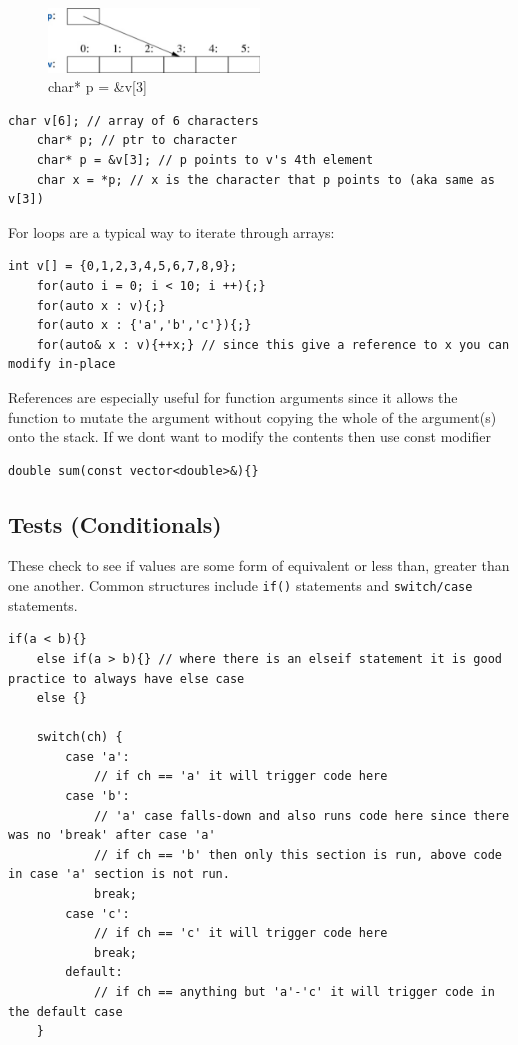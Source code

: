\documentclass[a4paper, 10pt]{article}
\begin{document}
\begin{figure}[ht]
	\centering
	\includegraphics[width=0.5\textwidth]{pointer.png}
	\caption{char* p = \&v[3]}
\end{figure}

\begin{lstlisting}[style=cpp]
    char v[6]; // array of 6 characters
    char* p; // ptr to character
    char* p = &v[3]; // p points to v's 4th element
    char x = *p; // x is the character that p points to (aka same as v[3])
\end{lstlisting}
For loops are a typical way to iterate through arrays:
\begin{lstlisting}[style=cpp]
    int v[] = {0,1,2,3,4,5,6,7,8,9};
    for(auto i = 0; i < 10; i ++){;}
    for(auto x : v){;}
    for(auto x : {'a','b','c'}){;}
    for(auto& x : v){++x;} // since this give a reference to x you can modify in-place
\end{lstlisting}
References are especially useful for function arguments since it allows the function to mutate the
argument without copying the whole of the argument(s) onto the stack. If we dont want to modify the
contents then use const modifier
\begin{lstlisting}[style=cpp]
    double sum(const vector<double>&){}
\end{lstlisting}

\subsection{Tests (Conditionals)}
These check to see if values are some form of equivalent or less than, greater than one another.
Common structures include \verb!if()! statements and \verb!switch/case! statements.
\begin{lstlisting}[style=cpp]
    if(a < b){}
    else if(a > b){} // where there is an elseif statement it is good practice to always have else case
    else {}

    switch(ch) {
        case 'a':
            // if ch == 'a' it will trigger code here
        case 'b':
            // 'a' case falls-down and also runs code here since there was no 'break' after case 'a'
            // if ch == 'b' then only this section is run, above code in case 'a' section is not run.
            break;
        case 'c':
            // if ch == 'c' it will trigger code here
            break;
        default:
            // if ch == anything but 'a'-'c' it will trigger code in the default case
    }



\end{lstlisting}
\end{document}
